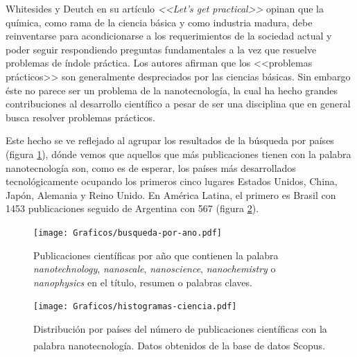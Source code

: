 	 Whitesides y Deutch en su artículo \textit{<<Let's get practical>>}\cite{Burdass2010} opinan que la química, como rama de la ciencia básica y como industria madura, debe reinventarse para acondicionarse a los requerimientos de la sociedad actual y poder seguir respondiendo preguntas fundamentales a la vez que resuelve problemas de índole práctica. Los autores afirman que los <<problemas prácticos>> son generalmente despreciados por las ciencias básicas.  Sin embargo éste no parece ser un problema de la nanotecnología, la cual ha hecho grandes contribuciones al desarrollo científico a pesar de ser una disciplina que en general busca resolver problemas prácticos.
			

	 \pagebreak Este hecho se ve reflejado al agrupar los resultados de la búsqueda por países (figura \ref{fig:publicaciones-ano}), dónde vemos que aquellos que más publicaciones tienen con la palabra nanotecnología son, como es de esperar, los países más desarrollados tecnológicamente ocupando los primeros cinco lugares Estados Unidos, China, Japón, Alemania y Reino Unido. En América Latina, el primero es Brasil con 1453 publicaciones seguido de Argentina con 567 (figura \ref{fig:paises}).


 			\begin{figure}[t!]
 			\begin{center}
 			\hspace{0.3cm}\texttt{[image: Graficos/busqueda-por-ano.pdf]}
 			\vspace*{-0.6cm}
 			\caption[Publicaciones por año en nanotecnología]{Publicaciones científicas por año que contienen la palabra \textit{nanotechnology}, \textit{nanoscale}, \textit{nanoscience}, \textit{nanochemistry} o \textit{nanophysics} en el título, resumen o palabras claves.}
 			\label{fig:publicaciones-ano}
 			\vspace*{-0.2cm} 		    
 			\end{center}
 		    \end{figure}

			\begin{figure}[b!]
 				\begin{center}
 				\texttt{[image: Graficos/histogramas-ciencia.pdf]}
 				\vspace*{-0.4cm}
 				\caption[Nanotecnología por países]{Distribución por países del número de publicaciones científicas con la palabra nanotecnología. Datos obtenidos de la base de datos Scopus\textsuperscript\textregistered.}
 				\label{fig:paises}
 		    	\end{center}
 		    	\end{figure}

